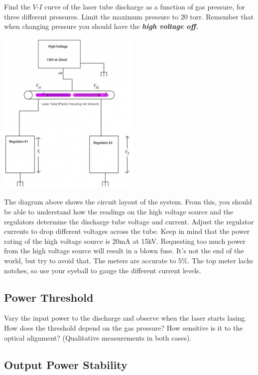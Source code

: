 \documentclass{../lab}
\begin{document}
Find the $V$-$I$ curve of the laser tube discharge as a function of gas pressure, for three different pressures. Limit the maximum pressure to 20 torr. Remember that when changing pressure you should have the \emph{\textbf{high voltage off.}}

\begin{center}
    \href{http://experimentationlab.berkeley.edu/sites/default/files/upimages/2_lasercircuitpic_small.jpg}{\includegraphics[width=0.5\linewidth]{images/2_lasercircuitpic_small.jpg}}
\end{center}

The diagram above shows the circuit layout of the system. From this, you should be able to understand how the readings on the high voltage source and the regulators determine the discharge tube voltage and current. Adjust the regulator currents to drop different voltages across the tube. Keep in mind that the power rating of the high voltage source is 20mA at 15kV. Requesting too much power from the high voltage source will result in a blown fuse. It's not the end of the world, but try to avoid that. The meters are accurate to 5\%. The top meter lacks notches, so use your eyeball to gauge the different current levels.

\subsection{Power Threshold}

Vary the input power to the discharge and observe when the laser starts lasing. How does the threshold depend on the gas pressure? How sensitive is it to the optical alignment? (Qualitative measurements in both cases).

\subsection{Output Power Stability}
\end{document}
